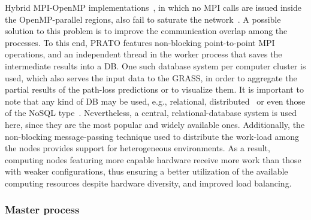 Hybrid MPI-OpenMP implementations~\cite{Tabik-High_performance_three_horizon_composition_algorithm_for_large_scale_terrains:2011,Tabik-Optimal_tilt_and_orientation_maps_a_multi_algorithm_approach_for_heterogeneous_multicore_GPU_systems:2013},
in which no MPI calls are issued inside the OpenMP-parallel regions,
also fail to saturate the network~\cite{Rabenseifner-Hybrid_MPI_OpenMP_parallel_programming_on_clusters_of_multicore_nodes:2009}.
A possible solution to this problem is to improve the communication
overlap among the processes. To this end, PRATO features non-blocking
point-to-point MPI operations, and an independent thread in the worker
process that saves the intermediate results into a DB. One such database
system per computer cluster is used, which also serves the input data
to the GRASS, in order to aggregate the partial results of the path-loss
predictions or to visualize them. It is important to note that any
kind of DB may be used, e.g., relational, distributed~\cite{Ozsu_Principles_of_distributed_database_systems:2011}
or even those of the NoSQL type~\cite{Stonebraker_SQL_databases_vs_NoSQL_databases:2010}.
Nevertheless, a central, relational-database system is used here,
since they are the most popular and widely available ones. Additionally,
the non-blocking message-passing technique used to distribute the
work-load among the nodes provides support for heterogeneous environments.
As a result, computing nodes featuring more capable hardware receive
more work than those with weaker configurations, thus ensuring a better
utilization of the available computing resources despite hardware
diversity, and improved load balancing.


\subsubsection{Master process \label{sub:04-Master-process}}

